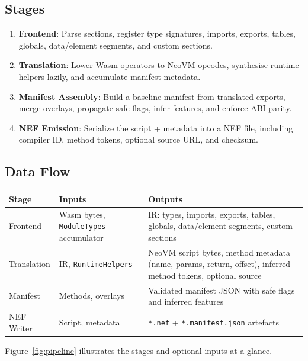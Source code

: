 \documentclass[11pt]{article}
\begin{document}
\subsection{Stages}
\begin{enumerate}[label=\arabic*., nosep]
    \item \textbf{Frontend}: Parse sections, register type signatures, imports, exports, tables, globals, data/element segments, and custom sections.
    \item \textbf{Translation}: Lower Wasm operators to NeoVM opcodes, synthesise runtime helpers lazily, and accumulate manifest metadata.
    \item \textbf{Manifest Assembly}: Build a baseline manifest from translated exports, merge overlays, propagate safe flags, infer features, and enforce ABI parity.
    \item \textbf{NEF Emission}: Serialize the script + metadata into a NEF file, including compiler ID, method tokens, optional source URL, and checksum.
\end{enumerate}

\subsection{Data Flow}
\begin{center}
\begin{tabular}{>{\raggedright}p{3.6cm} >{\raggedright}p{5cm} >{\raggedright\arraybackslash}p{4.4cm}}
\toprule
Stage & Inputs & Outputs \\
\midrule
Frontend & Wasm bytes, \texttt{ModuleTypes} accumulator & IR: types, imports, exports, tables, globals, data/element segments, custom sections \\
Translation & IR, \texttt{RuntimeHelpers} & NeoVM script bytes, method metadata (name, params, return, offset), inferred method tokens, optional source \\
Manifest & Methods, overlays & Validated manifest JSON with safe flags and inferred features \\
NEF Writer & Script, metadata & \texttt{*.nef} + \texttt{*.manifest.json} artefacts \\
\bottomrule
\end{tabular}
\end{center}
Figure~\ref{fig:pipeline} illustrates the stages and optional inputs at a glance.
\end{document}

